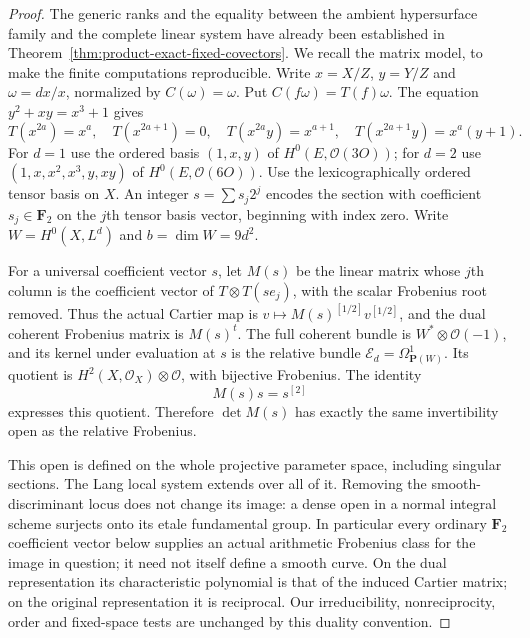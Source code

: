 \begin{proof}
The generic ranks and the equality between the ambient hypersurface
family and the complete linear system have already been established
in Theorem~\ref{thm:product-exact-fixed-covectors}.  We recall the
matrix model, to make the finite computations reproducible.
Write $x=X/Z$, $y=Y/Z$ and $\omega=dx/x$, normalized by
$C(\omega)=\omega$.  Put $C(f\omega)=T(f)\omega$.
The equation $y^2+xy=x^3+1$ gives
\[
 T(x^{2a})=x^a,\quad T(x^{2a+1})=0,\quad
 T(x^{2a}y)=x^{a+1},\quad
 T(x^{2a+1}y)=x^a(y+1).
\]
For $d=1$ use the ordered basis $(1,x,y)$ of
$H^0(E,\mathcal O(3O))$; for $d=2$ use
$(1,x,x^2,x^3,y,xy)$ of $H^0(E,\mathcal O(6O))$.
Use the lexicographically ordered tensor basis on $X$.
An integer $s=\sum s_j2^j$ encodes the section with coefficient
$s_j\in\mathbf F_2$ on the $j$th tensor basis vector, beginning
with index zero.  Write $W=H^0(X,L^d)$ and $b=\dim W=9d^2$.

For a universal coefficient vector $s$, let $M(s)$ be the linear
matrix whose $j$th column is the coefficient vector of
$T\otimes T(s e_j)$, with the scalar Frobenius root removed.
Thus the actual Cartier map is
$v\mapsto M(s)^{[1/2]}v^{[1/2]}$, and the dual coherent
Frobenius matrix is $M(s)^t$.
The full coherent bundle is $W^*\otimes\mathcal O(-1)$, and its
kernel under evaluation at $s$ is the relative bundle
$\mathcal E_d=\Omega^1_{\mathbf P(W)}$.
Its quotient is $H^2(X,\mathcal O_X)\otimes\mathcal O$, with
bijective Frobenius.  The identity
\[
                       M(s)s=s^{[2]}
\]
expresses this quotient.  Therefore $\det M(s)$ has exactly the
same invertibility open as the relative Frobenius.

This open is defined on the whole projective parameter space,
including singular sections.  The Lang local system extends over
all of it.  Removing the smooth-discriminant locus does not change
its image: a dense open in a normal integral scheme surjects onto
its etale fundamental group.  In particular every ordinary
$\mathbf F_2$ coefficient vector below supplies an actual
arithmetic Frobenius class for the image in question; it need not
itself define a smooth curve.  On the dual representation its
characteristic polynomial is that of the induced Cartier matrix;
on the original representation it is reciprocal.  Our irreducibility,
nonreciprocity, order and fixed-space tests are unchanged by this
duality convention.


\end{proof}
